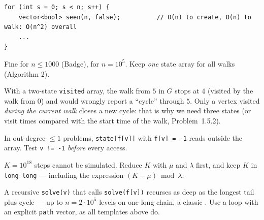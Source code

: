 \begin{warningbox}
\begin{lstlisting}[style=snippet]
for (int s = 0; s < n; s++) {
    vector<bool> seen(n, false);          // O(n) to create, O(n) to walk: O(n^2) overall
    ...
}
\end{lstlisting}
Fine for $n \le 1000$ (Badge), \tle{} for $n = 10^5$. Keep \emph{one} state array for all walks (Algorithm 2).
\end{warningbox}

\begin{warningbox}
With a two-state \texttt{visited} array, the walk from $5$ in $G$ stops at $4$ (visited by the walk from $0$) and would wrongly report a ``cycle'' through $5$. Only a vertex visited \emph{during the current walk} closes a new cycle: that is why we need three states (or visit times compared with the start time of the walk, Problem~1.5.2).
\end{warningbox}

\begin{warningbox}[{Mistake 3 --- forgetting \texttt{f[v] = -1}}]
In out-degree-$\le 1$ problems, \texttt{state[f[v]]} with \texttt{f[v] = -1} reads outside the array. Test \texttt{v != -1} \emph{before} every access.
\end{warningbox}

\begin{warningbox}
$K = 10^{18}$ steps cannot be simulated. Reduce $K$ with $\mu$ and $\lambda$ first, and keep $K$ in \texttt{long long} --- including the expression $(K - \mu) \bmod \lambda$.
\end{warningbox}

\begin{warningbox}
A recursive \texttt{solve(v)} that calls \texttt{solve(f[v])} recurses as deep as the longest tail plus cycle --- up to $n = 2\cdot10^5$ levels on one long chain, a classic \stackoverflow. Use a loop with an explicit \texttt{path} vector, as all templates above do.
\end{warningbox}


